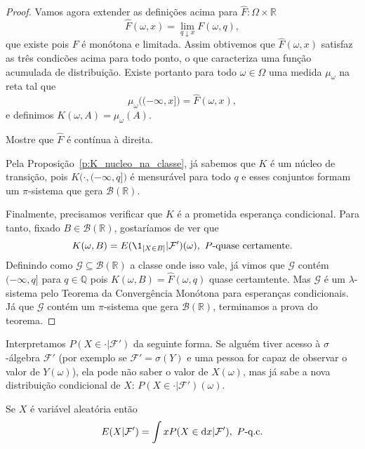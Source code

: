 \begin{proof}
  Vamos agora extender as definições acima para $\hat{F}:\Omega \times \mathbb{R}$
  \begin{equation}
    \hat{F}(\omega, x) = \lim_{q \downarrow x} F(\omega, q),
  \end{equation}
  que existe pois $F$ é monótona e limitada.
  Assim obtivemos que $\hat{F}(\omega, x)$ satisfaz as três condicões acima para todo ponto, o que caracteriza uma função acumulada de distribuição.
  Existe portanto para todo $\omega \in \Omega$ uma medida $\mu_\omega$ na reta tal que
  \begin{equation}
    \mu_\omega\big((-\infty, x]\big) = \hat{F}(\omega,x),
  \end{equation}
  e definimos $K(\omega, A) = \mu_\omega(A)$.

  \begin{exercise}
    Mostre que $\hat{F}$ é contínua à direita.
  \end{exercise}

  Pela Proposição~\ref{p:K_nucleo_na_classe}, já sabemos que $K$ é um núcleo de transição, pois $K\big(\cdot, (-\infty, q]\big)$ é mensurável para todo $q$ e esses conjuntos formam um $\pi$-sistema que gera $\mathcal{B}(\mathbb{R})$.

  Finalmente, precisamos verificar que $K$ é a prometida esperança condicional.
  Para tanto, fixado $B \in \mathcal{B}(\mathbb{R})$, gostaríamos de ver que
  \begin{equation}
    K(\omega, B) = E(\1_{[X \in B]} | \mathcal{F}')(\omega), \text{ $P$-quase certamente.}
  \end{equation}
  Definindo como $\mathcal{G} \subseteq \mathcal{B}(\mathbb{R})$ a classe onde isso vale, já vimos que $\mathcal{G}$ contém $(-\infty, q]$ para $q \in \mathbb{Q}$ pois $K(\omega, B) = \hat{F}(\omega, q)$ quase certamtente.
  Mas $\mathcal{G}$ é um $\lambda$-sistema pelo Teorema da Convergência Monótona para esperanças condicionais.
  Já que $\mathcal{G}$ contém um $\pi$-sistema que gera $\mathcal{B}(\mathbb{R})$, terminamos a prova do teorema.
\end{proof}

Interpretamos $P(X \in \cdot| \mathcal{F}')$ da seguinte forma.
Se alguém tiver acesso à $\sigma$-álgebra $\mathcal{F}'$ (por exemplo se $\mathcal{F}' = \sigma(Y)$ e uma pessoa for capaz de observar o valor de $Y(\omega)$), ela pode não saber o valor de $X(\omega)$, mas já sabe a nova distribuição condicional de $X$: $P(X \in \cdot|\mathcal{F}')(\omega)$.

\begin{exercise}
  Se $X$ é variável aleatória então
  \begin{equation}
    E(X|\mathcal{F}') = \int x P(X \in \mathop{}\!\mathrm{d} x|\mathcal{F}'), \text{ $P$-q.c.}
  \end{equation}
\end{exercise}

